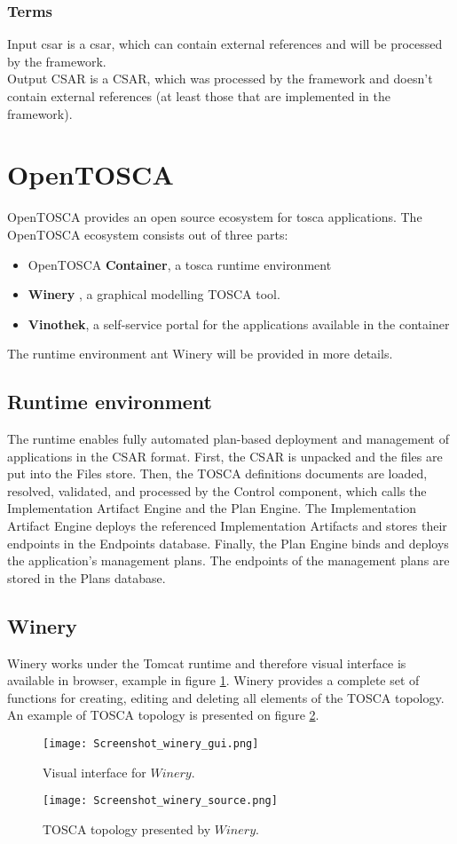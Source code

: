 \subsubsection*{Terms}
Input \gls{csar} is a \gls{csar}, which can contain external references and will be processed by the framework.\\
Output CSAR is a CSAR, which was processed by the framework and doesn't contain external references (at least those that are implemented in the framework).

\section{OpenTOSCA} \label{sec:opentosca}
OpenTOSCA provides an open source ecosystem for \gls{tosca} applications. 
The OpenTOSCA ecosystem consists out of three parts: \cite*{OpenTOSCA}
\begin{itemize}
	\item OpenTOSCA \textbf{Container}, a \gls{tosca} runtime environment
	\item \textbf{Winery} \label{tool:winery}, a graphical modelling TOSCA tool.
	\item \textbf{Vinothek}, a self-service portal for the applications available in the container
\end{itemize}
The runtime environment ant Winery will be provided in more details. 
\subsection*{Runtime environment}
The runtime enables fully automated plan-based deployment and management of applications in the CSAR format. 
First, the CSAR is unpacked and the files are put into the Files store.
Then, the TOSCA definitions documents are loaded, resolved, validated, and processed by the Control component, which calls the Implementation Artifact Engine and the Plan Engine.
The Implementation Artifact Engine deploys the referenced Implementation Artifacts and stores their endpoints in the Endpoints database. 
Finally, the Plan Engine binds and deploys the application’s management plans.
The endpoints of the management plans are stored in the Plans database.
\cite{INPROC-2013-45}
\subsection*{Winery}\label{subs:wine}
Winery works under the Tomcat runtime and therefore visual interface is available in browser, example in figure \ref{fig:winery_gui}.
Winery provides a complete set of functions for creating, editing and deleting all elements of the TOSCA topology. 
An example of TOSCA topology is presented on figure \ref{fig:winery_source}.
\begin{figure}[ht]   
	\centering
	\texttt{[image: Screenshot\_winery\_gui.png]}
	\caption{Visual interface for $Winery$.}
	\label{fig:winery_gui}
\end{figure}
\begin{figure}[ht]   
\centering
\texttt{[image: Screenshot\_winery\_source.png]}
\caption{TOSCA topology presented by $Winery$.}
\label{fig:winery_source}
\end{figure}


